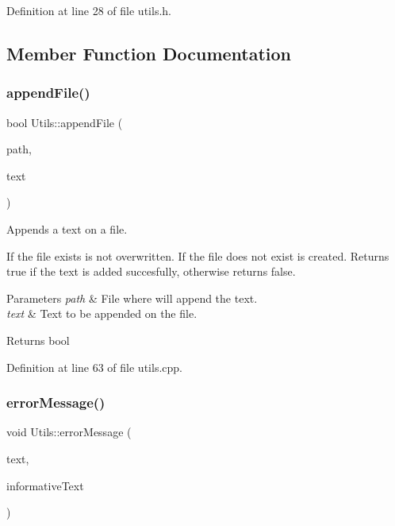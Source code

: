 Definition at line 28 of file utils.\+h.



\subsection{Member Function Documentation}
\mbox{\label{classUtils_a77efde99fa16c21245f66273c7fded3a}} 
\subsubsection{\texorpdfstring{append\+File()}{appendFile()}}
{\footnotesize\ttfamily bool Utils\+::append\+File (\begin{DoxyParamCaption}\item[{const Q\+String \&}]{path,  }\item[{const Q\+String \&}]{text }\end{DoxyParamCaption})\hspace{0.3cm}{\ttfamily [static]}}



Appends a text on a file. 

If the file exists is not overwritten. If the file does not exist is created. Returns true if the text is added succesfully, otherwise returns false. 
\begin{DoxyParams}{Parameters}
{\em path} & File where will append the text. \\
\hline
{\em text} & Text to be appended on the file. \\
\hline
\end{DoxyParams}
\begin{DoxyReturn}{Returns}
bool 
\end{DoxyReturn}


Definition at line 63 of file utils.\+cpp.

\mbox{\label{classUtils_ac24a694013a7415b517f63a0641a0fb6}} 
\subsubsection{\texorpdfstring{error\+Message()}{errorMessage()}}
{\footnotesize\ttfamily void Utils\+::error\+Message (\begin{DoxyParamCaption}\item[{const Q\+String \&}]{text,  }\item[{const Q\+String \&}]{informative\+Text }\end{DoxyParamCaption})\hspace{0.3cm}{\ttfamily [static]}}



